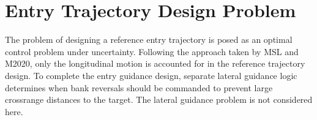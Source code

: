 \documentclass[journal ]{new-aiaa}
\newcommand{\state}{\ensuremath{\mathbf{x}}}
\begin{document}
% 




\section*{Entry Trajectory Design Problem}
The problem of designing a reference entry trajectory is posed as an optimal control problem under uncertainty. Following the approach taken by MSL and M2020, only the longitudinal motion is accounted for in the reference trajectory design. To complete the entry guidance design, separate lateral guidance logic determines when bank reversals should be commanded to prevent large crossrange distances to the target. The lateral guidance problem is not considered here.
\end{document}
